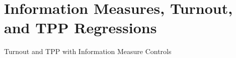 \documentclass[12pt]{article}
\begin{document}
\begin{appendix}
\begin{landscape}
    
\end{landscape}

\section{Information Measures, Turnout, and TPP Regressions}\label{appendix_inforegs}


\begin{table}
\centering
\caption{Turnout and TPP with Information Measure Controls}\label{}

\end{table}





\end{appendix}
\end{document}

